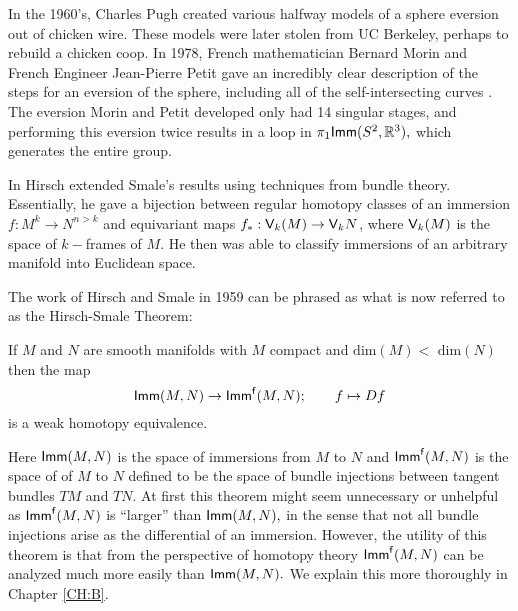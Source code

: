 In the 1960's, Charles Pugh created various halfway models of a sphere eversion out of chicken wire. These models were later stolen from UC Berkeley, perhaps to rebuild a chicken coop. In 1978, French mathematician Bernard Morin and French Engineer Jean-Pierre Petit gave an incredibly clear description of the steps for an eversion of the sphere, including all of the self-intersecting curves \cite{Morin}. The eversion Morin and Petit developed only had 14 singular stages, and performing this eversion twice results in a loop in $\pi_{1}{\sf Imm}(S^{2}, \mathbb R^{3}),$ which generates the entire group.


In \cite{Hir} Hirsch extended Smale's results using techniques from bundle theory. Essentially, he gave a bijection between regular homotopy classes of an immersion $f: M^{k} \rightarrow N^{n > k}$ and equivariant maps $f_{\ast}: \mathsf V_{k}(M) \rightarrow \mathsf V_{k}N$, where $\mathsf V_{k}(M)$ is the space of $k-$frames of $M.$  He then was able to classify immersions of an arbitrary manifold into Euclidean space. 


The work of Hirsch and Smale in 1959 can be phrased as what is now referred to as the Hirsch-Smale Theorem:
\begin{theorem} \label{hst}
If $M$ and $N$ are smooth manifolds with $M$ compact and $\text{dim}(M) < \text{ dim} (N)$ then the map
\[
{\sf Imm}(M, N) \rightarrow {\sf Imm}^{\sf f}(M, N); \qquad f \mapsto Df
\]
is a weak homotopy equivalence.
\end{theorem}
\noindent Here ${\sf Imm}(M, N)$ is the space of immersions from $M$ to $N$ and ${\sf Imm}^{\sf f}(M, N)$ is the space of  of $M$ to $N$ defined to be the space of bundle injections between tangent bundles $TM$ and $TN$. At first this theorem might seem unnecessary or unhelpful as ${\sf Imm}^{\sf f}(M, N)$ is ``larger'' than ${\sf Imm}(M, N),$ in the sense that not all bundle injections arise as the differential of an immersion. However, the utility of this theorem is that from the perspective of homotopy theory ${\sf Imm}^{\sf f}(M, N)$ can be analyzed much more easily than ${\sf Imm}(M, N).$ We explain this more thoroughly in Chapter \ref{CH:B}.


